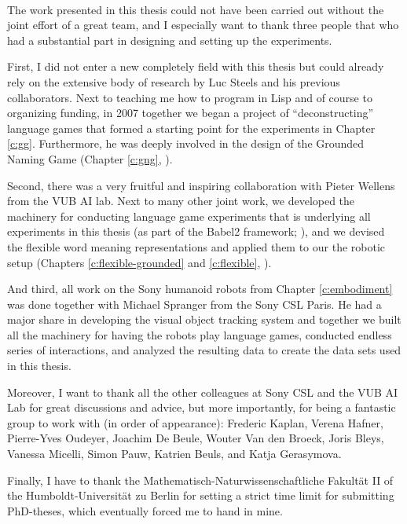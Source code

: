 ~\\

\noindent The work presented in this thesis could not have been
carried out without the joint effort of a great team, and I especially
want to thank three people that who had a substantial part in
designing and setting up the experiments.

First, I did not enter a new completely field with this thesis but
could already rely on the extensive body of research by Luc Steels and
his previous collaborators. Next to teaching me how to program in Lisp
and of course to organizing funding, in 2007 together we began a
project of ``deconstructing'' language games that formed a starting
point for the experiments in Chapter \ref{c:gg}. Furthermore, he was
deeply involved in the design of the Grounded Naming Game (Chapter
\ref{c:gng}, \citealp*{steels12grounded-naming-game}).


Second, there was a very fruitful and inspiring collaboration with
Pieter Wellens from the VUB AI lab. Next to many other joint work, we
developed the machinery for conducting language game experiments that
is underlying all experiments in this thesis (as part of the Babel2
framework; \citealp*{loetzsch08babel2,steels10babel}), and we devised
the flexible word meaning representations and applied them to our the
robotic setup (Chapters \ref{c:flexible-grounded} and
\ref{c:flexible},
\citealp*{wellens08flexible,wellens12multi-dimensional}).


And third, all work on the Sony humanoid robots from Chapter
\ref{c:embodiment} \citep*{spranger12perceptual} was done together
with Michael Spranger from the Sony CSL Paris. He had a major share in
developing the visual object tracking system and together we built all
the machinery for having the robots play language games, conducted
endless series of interactions, and analyzed the resulting data to
create the data sets used in this thesis.


Moreover, I want to thank all the other colleagues at Sony CSL and the
VUB AI Lab for great discussions and advice, but more importantly, for
being a fantastic group to work with (in order of appearance):
Frederic Kaplan, Verena Hafner, Pierre-Yves Oudeyer, Joachim De Beule,
Wouter Van den Broeck, Joris Bleys, Vanessa Micelli, Simon Pauw,
Katrien Beuls, and Katja Gerasymova.


Finally, I have to thank the Mathematisch-Naturwissenschaftliche
Fakultät II of the Humboldt-Universität zu Berlin for setting a strict
time limit for submitting PhD-theses, which eventually forced me to
hand in mine.













